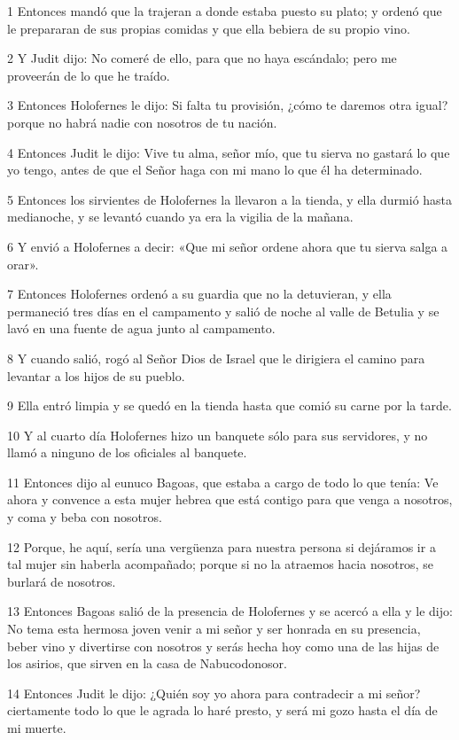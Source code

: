 \par 1 Entonces mandó que la trajeran a donde estaba puesto su plato; y ordenó que le prepararan de sus propias comidas y que ella bebiera de su propio vino.
\par 2 Y Judit dijo: No comeré de ello, para que no haya escándalo; pero me proveerán de lo que he traído.
\par 3 Entonces Holofernes le dijo: Si falta tu provisión, ¿cómo te daremos otra igual? porque no habrá nadie con nosotros de tu nación.
\par 4 Entonces Judit le dijo: Vive tu alma, señor mío, que tu sierva no gastará lo que yo tengo, antes de que el Señor haga con mi mano lo que él ha determinado.
\par 5 Entonces los sirvientes de Holofernes la llevaron a la tienda, y ella durmió hasta medianoche, y se levantó cuando ya era la vigilia de la mañana.
\par 6 Y envió a Holofernes a decir: «Que mi señor ordene ahora que tu sierva salga a orar».
\par 7 Entonces Holofernes ordenó a su guardia que no la detuvieran, y ella permaneció tres días en el campamento y salió de noche al valle de Betulia y se lavó en una fuente de agua junto al campamento.
\par 8 Y cuando salió, rogó al Señor Dios de Israel que le dirigiera el camino para levantar a los hijos de su pueblo.
\par 9 Ella entró limpia y se quedó en la tienda hasta que comió su carne por la tarde.
\par 10 Y al cuarto día Holofernes hizo un banquete sólo para sus servidores, y no llamó a ninguno de los oficiales al banquete.
\par 11 Entonces dijo al eunuco Bagoas, que estaba a cargo de todo lo que tenía: Ve ahora y convence a esta mujer hebrea que está contigo para que venga a nosotros, y coma y beba con nosotros.
\par 12 Porque, he aquí, sería una vergüenza para nuestra persona si dejáramos ir a tal mujer sin haberla acompañado; porque si no la atraemos hacia nosotros, se burlará de nosotros.
\par 13 Entonces Bagoas salió de la presencia de Holofernes y se acercó a ella y le dijo: No tema esta hermosa joven venir a mi señor y ser honrada en su presencia, beber vino y divertirse con nosotros y serás hecha hoy como una de las hijas de los asirios, que sirven en la casa de Nabucodonosor.
\par 14 Entonces Judit le dijo: ¿Quién soy yo ahora para contradecir a mi señor? ciertamente todo lo que le agrada lo haré presto, y será mi gozo hasta el día de mi muerte.
